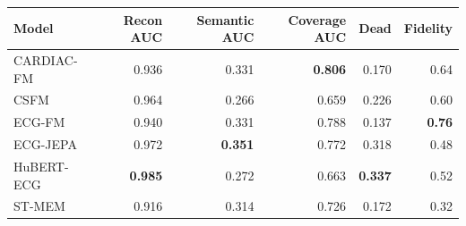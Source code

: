\begin{tabular}{lrrrrr}
\toprule
Model & Recon AUC & Semantic AUC & Coverage AUC & Dead & Fidelity \\
\midrule
CARDIAC-FM & 0.936 & 0.331 & \textbf{0.806} & 0.170 & 0.64 \\
CSFM & 0.964 & 0.266 & 0.659 & 0.226 & 0.60 \\
ECG-FM & 0.940 & 0.331 & 0.788 & 0.137 & \textbf{0.76} \\
ECG-JEPA & 0.972 & \textbf{0.351} & 0.772 & 0.318 & 0.48 \\
HuBERT-ECG & \textbf{0.985} & 0.272 & 0.663 & \textbf{0.337} & 0.52 \\
ST-MEM & 0.916 & 0.314 & 0.726 & 0.172 & 0.32 \\
\bottomrule
\end{tabular}
